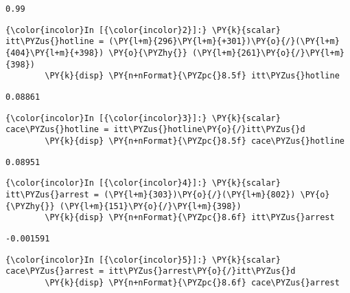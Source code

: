 \documentclass[11pt,notitlepage]{article}\usepackage[]{graphicx}\usepackage[]{color}
\makeatletter
\newenvironment{kframe}{%
 \def\at@end@of@kframe{}%
 \ifinner\ifhmode%
  \def\at@end@of@kframe{\end{minipage}}%
  \begin{minipage}{\columnwidth}%
 \fi\fi%
 \def\FrameCommand##1{\hskip\@totalleftmargin \hskip-\fboxsep
 \colorbox{shadecolor}{##1}\hskip-\fboxsep
     \hskip-\linewidth \hskip-\@totalleftmargin \hskip\columnwidth}%
 \MakeFramed {\advance\hsize-\width
   \@totalleftmargin\z@ \linewidth\hsize
   \@setminipage}}%
 {\par\unskip\endMakeFramed%
 \at@end@of@kframe}
\newenvironment{knitrout}{}{} %
\makeatother
\begin{document}
\begin{enumerate}[a)]
\begin{knitrout}
\begin{kframe}
    \begin{Verbatim}[commandchars=\\\{\}]
    0.99

    \end{Verbatim}

    \begin{Verbatim}[commandchars=\\\{\}]
{\color{incolor}In [{\color{incolor}2}]:} \PY{k}{scalar} itt\PYZus{}hotline = (\PY{l+m}{296}\PY{l+m}{+301})\PY{o}{/}(\PY{l+m}{404}\PY{l+m}{+398}) \PY{o}{\PYZhy{}} (\PY{l+m}{261}\PY{o}{/}\PY{l+m}{398})
        \PY{k}{disp} \PY{n+nFormat}{\PYZpc{}8.5f} itt\PYZus{}hotline
\end{Verbatim}

    \begin{Verbatim}[commandchars=\\\{\}]
 0.08861

    \end{Verbatim}

    \begin{Verbatim}[commandchars=\\\{\}]
{\color{incolor}In [{\color{incolor}3}]:} \PY{k}{scalar} cace\PYZus{}hotline = itt\PYZus{}hotline\PY{o}{/}itt\PYZus{}d
        \PY{k}{disp} \PY{n+nFormat}{\PYZpc{}8.5f} cace\PYZus{}hotline
\end{Verbatim}

    \begin{Verbatim}[commandchars=\\\{\}]
 0.08951

    \end{Verbatim}

    \begin{Verbatim}[commandchars=\\\{\}]
{\color{incolor}In [{\color{incolor}4}]:} \PY{k}{scalar} itt\PYZus{}arrest = (\PY{l+m}{303})\PY{o}{/}(\PY{l+m}{802}) \PY{o}{\PYZhy{}} (\PY{l+m}{151}\PY{o}{/}\PY{l+m}{398})
        \PY{k}{disp} \PY{n+nFormat}{\PYZpc{}8.6f} itt\PYZus{}arrest
\end{Verbatim}

    \begin{Verbatim}[commandchars=\\\{\}]
-0.001591

    \end{Verbatim}

    \begin{Verbatim}[commandchars=\\\{\}]
{\color{incolor}In [{\color{incolor}5}]:} \PY{k}{scalar} cace\PYZus{}arrest = itt\PYZus{}arrest\PY{o}{/}itt\PYZus{}d
        \PY{k}{disp} \PY{n+nFormat}{\PYZpc{}8.6f} cace\PYZus{}arrest
\end{Verbatim}


\end{kframe}
\end{knitrout}
\end{enumerate}
\end{document}
